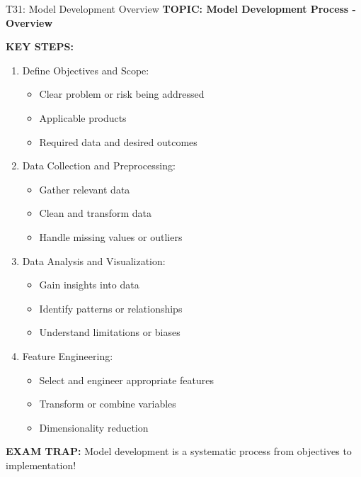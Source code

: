 \documentclass[8pt]{beamer}
\begin{document}
	
	\begin{frame}{T31: Model Development Overview}
		\fontsize{6.5}{7.5}\selectfont
		\textbf{TOPIC: Model Development Process - Overview}
		
		\vspace{0.1cm}
		\textbf{KEY STEPS:}
		\begin{enumerate}
			\item \textcolor{myblue}{Define Objectives and Scope:}
			\begin{itemize}
				\item Clear problem or risk being addressed
				\item Applicable products
				\item Required data and desired outcomes
			\end{itemize}
			\item \textcolor{myblue}{Data Collection and Preprocessing:}
			\begin{itemize}
				\item Gather relevant data
				\item Clean and transform data
				\item Handle missing values or outliers
			\end{itemize}
			\item \textcolor{myblue}{Data Analysis and Visualization:}
			\begin{itemize}
				\item Gain insights into data
				\item Identify patterns or relationships
				\item Understand limitations or biases
			\end{itemize}
			\item \textcolor{myblue}{Feature Engineering:}
			\begin{itemize}
				\item Select and engineer appropriate features
				\item Transform or combine variables
				\item Dimensionality reduction
			\end{itemize}
		\end{enumerate}
		
		\textcolor{myred}{\textbf{EXAM TRAP:}} Model development is a \textcolor{myblue}{systematic process from objectives to implementation}!
	\end{frame}
	
\end{document}
